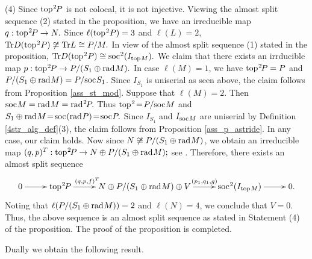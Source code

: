\documentclass[10pt]{amsart}
\theoremstyle{definition}
\newcommand{\rad}{{\rm rad}\hspace{.5pt}}
\newcommand{\soc}{{\rm soc}\hspace{.5pt}}
\newcommand{\ntop}{{\rm top}\hspace{.5pt}}
\begin{document}
(4) Since $\ntop^2\hspace{-1.2pt}P$ is not colocal, it is not injective. Viewing the almost split sequence (2) stated in the proposition, we have an irreducible map $q: \ntop^2\hspace{-1.2pt} P\to N.$ Since $\ell(\ntop^2P)=3$ and $\ell(L)=2,$ ${\rm Tr}D(\ntop^2P)\not\cong {\rm Tr} L\cong P/M.$ In view of the almost split sequence (1) stated in the proposition, ${\rm Tr}D(\ntop^2P)\cong \soc^2(I_{\ntop M}).$
We claim that there exists an irrducible map $p: \ntop^2\hspace{-1.2pt} P \to P/(S_1\oplus \rad M).$ In case $\ell(M)=1$, we have $\ntop^2\hspace{-1.2pt}P=P$ and $P/(S_1\oplus \rad M)=P/\soc S_1$. Since $I_{S_1}$ is uniserial as seen above, the claim follows from Proposition \ref{ass_st_mod}. Suppose that $\ell(M)=2.$ Then $\soc M = \rad M = \rad^2\hspace{-1.2pt}P.$ Thus $\ntop^2 \! = \! P/\soc M$ and $S_1\oplus \rad M \! = \! \soc(\rad P) \! = \! \soc P.$ 
Since  
$I_{S_1}$ and $I_{\soc M}$ are uniserial by Definition \ref{4str_alg_def}(3), the claim follows from Proposition \ref{ass_p_astride}. In any case, our claim holds. Now since $N\not\cong P/(S_1\oplus \rad M)$, we obtain an irreducible map $(q, p)^T: \ntop^2\hspace{-1.2pt} P \to N\oplus P/(S_1\oplus \rad M);$ see \cite{Bau}. Therefore, there exists an almost split sequence \vspace{-5pt}
$$\xymatrixcolsep{26pt}\xymatrix{0\ar[r] & \ntop^2\hspace{-1.2pt}P \ar[r]^-{(q, p, f)^T\hspace{-6pt}} & N\oplus P/(S_1\oplus \rad M) \oplus V \ar[r]^-{(p_1, q_1, g)} & \soc^2(I_{\ntop M}) \ar[r] & 0.}\vspace{-4pt}$$ Noting that $\ell(P/(S_1\oplus \rad M))=2$ and $\ell(N)=4$, we conclude that $V=0$. Thus, the above sequence is an almost split sequence as stated in Statement (4) of the proposition. The proof of the proposition is completed.

\smallskip

Dually we obtain the following result.

\vspace{-1pt}
\end{document}
